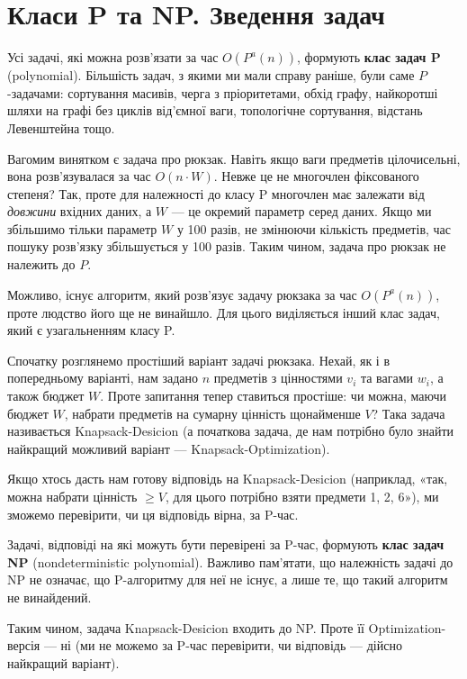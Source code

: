 \documentclass[12pt,a4paper]{report}
\begin{document}
\section{Класи P та NP. Зведення задач}

Усі задачі, які можна розв’язати за час \(O(P ^ a(n))\), формують \textbf{клас задач P} (polynomial). Більшість задач, з якими ми мали справу раніше, були саме \(P\)-задачами: сортування масивів, черга з пріоритетами, обхід графу, найкоротші шляхи на графі без циклів від’ємної ваги, топологічне сортування, відстань Левенштейна тощо.

Вагомим винятком є задача про рюкзак. Навіть якщо ваги предметів цілочисельні, вона розв’язувалася за час \(O(n \cdot W)\). Невже це не многочлен фіксованого степеня? Так, проте для належності до класу P многочлен має залежати від \emph{довжини} вхідних даних, а \(W\) --- це окремий параметр серед даних. Якщо ми збільшимо тільки параметр \(W\) у 100 разів, не змінюючи кількість предметів, час пошуку розв’язку збільшується у 100 разів. Таким чином, задача про рюкзак не належить до \(P\).

Можливо, існує алгоритм, який розв’язує задачу рюкзака за час \(O(P ^ a(n))\), проте людство його ще не винайшло. Для цього виділяється інший клас задач, який є узагальненням класу P.

Спочатку розглянемо простіший варіант задачі рюкзака. Нехай, як і в попередньому варіанті, нам задано \(n\) предметів з цінностями \(v_i\) та вагами \(w_i\), а також бюджет \(W\). Проте запитання тепер ставиться простіше: чи можна, маючи бюджет \(W\), набрати предметів на сумарну цінність щонайменше \(V\)? Така задача називається Knapsack-Desicion (а початкова задача, де нам потрібно було знайти найкращий можливий варіант --- Knapsack-Optimization).

Якщо хтось дасть нам готову відповідь на Knapsack-Desicion (наприклад, «так, можна набрати цінність \(\geq V\), для цього потрібно взяти предмети 1, 2, 6»), ми зможемо перевірити, чи ця відповідь вірна, за P-час.

Задачі, відповіді на які можуть бути перевірені за P-час, формують \textbf{клас задач NP} (nondeterministic polynomial). Важливо пам’ятати, що належність задачі до NP не означає, що P-алгоритму для неї не існує, а лише те, що такий алгоритм не винайдений.

Таким чином, задача Knapsack-Desicion входить до NP. Проте її Optimization-версія --- ні (ми не можемо за P-час перевірити, чи відповідь --- дійсно найкращий варіант).
\end{document}
